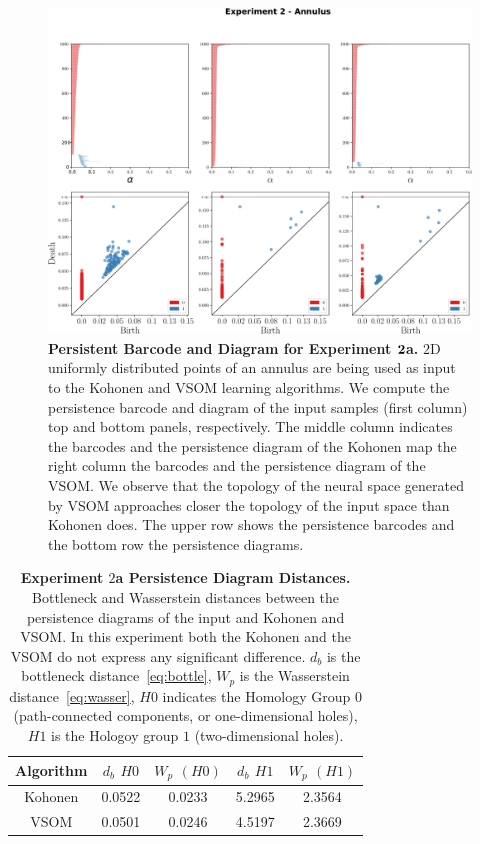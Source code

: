 \begin{figure}[!htpb]
     \centering
     \includegraphics[width=\textwidth]{figures/experiment-2-pd.pdf}
     \caption{{\bfseries \sffamily Persistent Barcode and Diagram for 
     Experiment ${\bf 2}$a.} $2$D uniformly distributed points of an annulus are being used 
     as input to the Kohonen and VSOM learning algorithms. We compute the persistence 
     barcode and diagram of the input samples (first column) top and bottom panels, respectively. 
     The middle column indicates the barcodes and the persistence diagram of the Kohonen
     map the right column the barcodes and the persistence diagram of the VSOM. We observe
     that the topology of the neural space generated by VSOM approaches closer the topology
     of the input space than Kohonen does. The upper row shows the persistence barcodes and
     the bottom row the persistence diagrams. }%
     \label{Fig:persistence_exp2}
\end{figure}

\begin{table}[!ht]
  \begin{center}
    \begin{tabular}{ccccc}
        \textbf{Algorithm} & $d_b$ $H0$ & $W_p$ $(H0)$ & $d_b$ $H1$ & $W_p$ $(H1)$ \\
        \hline
        Kohonen & 0.0522 & 0.0233 & 5.2965 & 2.3564 \\
        VSOM    & 0.0501 & 0.0246 & 4.5197 & 2.3669
      \end{tabular}
      \caption{\textbf{Experiment $2$a Persistence Diagram Distances.} Bottleneck 
      and Wasserstein distances between the persistence diagrams of the input and 
      Kohonen and VSOM. In this experiment both the Kohonen and the VSOM do not express
      any significant difference. $d_b$ is the bottleneck distance~\eqref{eq:bottle},
      $W_p$ is the Wasserstein distance~\eqref{eq:wasser}, $H0$ indicates the Homology Group $0$
      (path-connected components, or one-dimensional holes), $H1$ is the Hologoy group $1$ 
      (two-dimensional holes).}
      \label{table:parameters}
  \end{center}
\end{table}


